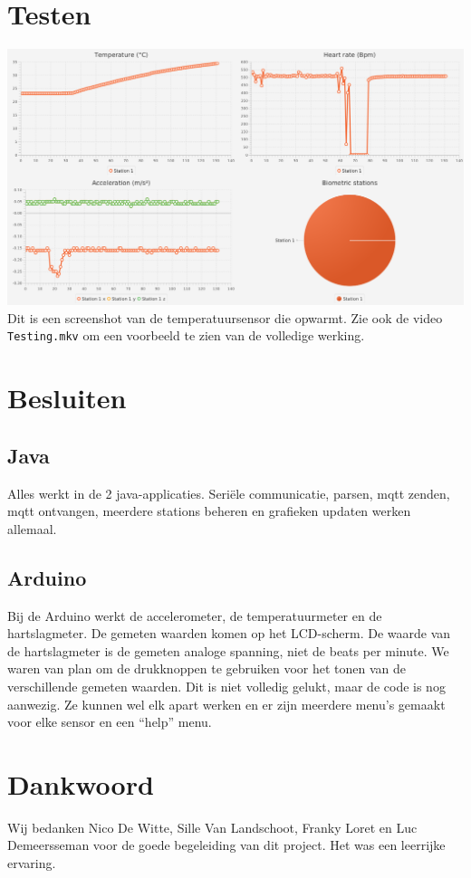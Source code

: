 \documentclass[a4paper]{report}
\newcommand{\code}[1]{\colorbox{light-gray}{\texttt{#1}}}
\begin{document}
\chapter{Testen}
    \includegraphics[width=\textwidth]{gui}\\
    Dit is een screenshot van de temperatuursensor die opwarmt.
    Zie ook de video \code{Testing.mkv} om een voorbeeld te zien van de volledige werking.

\chapter{Besluiten}
    \section{Java}
        Alles werkt in de 2 java-applicaties.
        Seri\"ele communicatie, parsen, mqtt zenden, mqtt ontvangen, meerdere stations beheren en grafieken updaten werken allemaal.

    \section{Arduino}
        Bij de Arduino werkt de accelerometer, de temperatuurmeter en de hartslagmeter.
        De gemeten waarden komen op het LCD-scherm.
        De waarde van de hartslagmeter is de gemeten analoge spanning, niet de beats per minute.
        We waren van plan om de drukknoppen te gebruiken voor het tonen van de verschillende gemeten waarden.
        Dit is niet volledig gelukt, maar de code is nog aanwezig.
        Ze kunnen wel elk apart werken en er zijn meerdere menu's gemaakt voor elke sensor en een ``help'' menu.

\chapter{Dankwoord}
    Wij bedanken Nico De Witte, Sille Van Landschoot, Franky Loret en Luc Demeersseman voor de goede begeleiding van dit project.
    Het was een leerrijke ervaring.
\end{document}
